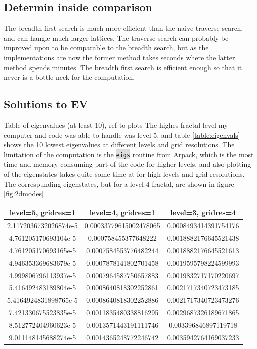 \documentclass{article}
\begin{document}
\subsection{Determin inside comparison}
The breadth first search is much more efficient than the naive traverse search, and can hangle much larger lattices. The traverse search can probably be improved upon to be comparable to the breadth search, but as the implementations are now the former method takes seconds where the latter method spends minutes. The breadth first search is efficient enough so that it never is a bottle neck for the computation. 

\subsection{Solutions to EV}
Table of eigenvalues (at least 10), ref to plots
The highes fractal level my computer and code was able to handle was level 5, and table \ref{table:eigenvals} shows the 10 lowest eigenvalues at different levels and grid resolutions. The limitation of the computation is the \colorbox{gainsboro}{\lstinline{eigs}} routine
from Arpack, which is the most time and memory consuming part of the code for higher levels, and also plotting of the eigenstates takes quite some time at for high levels and grid resolutions. The correspunding eigenstates, but for a level 4 fractal, are shown in figure \ref{fig:2dmodes}\\

\begin{tabular}{|c|c|c|}
    level=5, gridres=1   &  level=4, gridres=1 &    level=3, gridres=4\\
    \hline
    2.1172036732026874e-5   &   0.00033779615002478065  &   0.0008493414391754176\\
    4.761205170693104e-5    &   0.000758455377648222    &   0.0018882176645521438\\
    4.761205170693165e-5    &   0.0007584553776482244   &   0.0018882176645521613\\
    4.946353369683679e-5    &   0.0007878141802701458   &   0.0019595798224599993\\
    4.999806796113937e-5    &   0.0007964587750657883   &   0.0019832717170220697\\
    5.416492483189804e-5    &   0.0008640818302252861   &   0.0021717340723473185\\
    5.4164924831898765e-5   &   0.0008640818302252886   &   0.0021717340723473276\\
    7.421330675523835e-5    &   0.0011835480338816295   &   0.0029687326189671865\\
    8.512772404960623e-5    &   0.0013571443191111746   &   0.003396846897119718\\
    9.011148145688274e-5    &   0.0014365248772246742   &   0.0035942764169037233
    \label{table:eigenvals}
\end{tabular}
\end{document}
